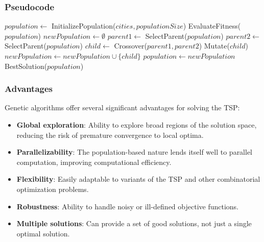 \subsubsection{Pseudocode}


\begin{algorithm}
	\caption{Genetic Algorithm for \Gls{TSP}}\label{alg:geneticalgorithm}
	\begin{algorithmic}[1]
		\State $population \gets$ InitializePopulation($cities, populationSize$)
		\State EvaluateFitness($population$)
		\State $newPopulation \gets \emptyset$
		\State $parent1 \gets$ SelectParent($population$)
		\State $parent2 \gets$ SelectParent($population$)
		\State $child \gets$ Crossover($parent1, parent2$)
		\State Mutate($child$)
		\EndIf
		\State $newPopulation \gets newPopulation \cup \{child\}$
		\EndWhile
		\State $population \gets newPopulation$
		\EndFor
		\State \Return BestSolution($population$)
		\EndProcedure
	\end{algorithmic}
\end{algorithm}

\subsubsection{Advantages}

Genetic algorithms offer several significant advantages for solving the \Gls{TSP}:

\begin{itemize}
	\item \textbf{Global exploration}: Ability to explore broad regions of the solution space, reducing the risk of premature convergence to local optima.
	\item \textbf{Parallelizability}: The population-based nature lends itself well to parallel computation, improving computational efficiency.
	\item \textbf{Flexibility}: Easily adaptable to variants of the \Gls{TSP} and other combinatorial optimization problems.
	\item \textbf{Robustness}: Ability to handle noisy or ill-defined objective functions.
	\item \textbf{Multiple solutions}: Can provide a set of good solutions, not just a single optimal solution.
\end{itemize}

